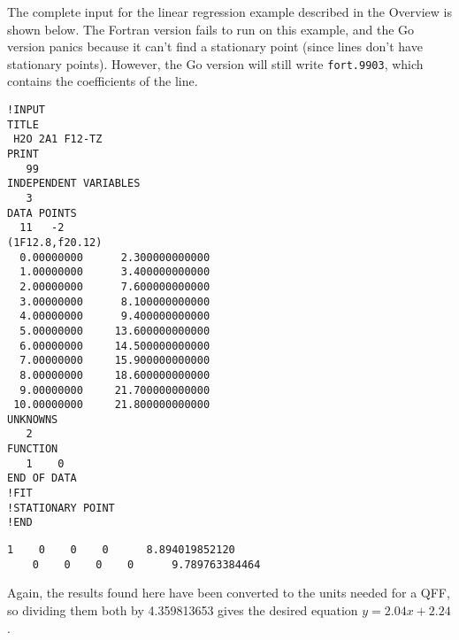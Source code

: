 \documentclass{article}
\begin{document}
The complete input for the linear regression example described in the Overview
is shown below. The Fortran version fails to run on this example, and the Go
version panics because it can't find a stationary point (since lines don't have
stationary points). However, the Go version will still write \verb|fort.9903|,
which contains the coefficients of the line.

\begin{lstlisting}[caption={anpass.in}]
!INPUT
TITLE
 H2O 2A1 F12-TZ
PRINT
   99
INDEPENDENT VARIABLES
   3
DATA POINTS
  11   -2
(1F12.8,f20.12)
  0.00000000      2.300000000000
  1.00000000      3.400000000000
  2.00000000      7.600000000000
  3.00000000      8.100000000000
  4.00000000      9.400000000000
  5.00000000     13.600000000000
  6.00000000     14.500000000000
  7.00000000     15.900000000000
  8.00000000     18.600000000000
  9.00000000     21.700000000000
 10.00000000     21.800000000000
UNKNOWNS
   2
FUNCTION
   1    0
END OF DATA
!FIT
!STATIONARY POINT
!END
\end{lstlisting}

\begin{lstlisting}[caption={fort.9903}]
    1    0    0    0      8.894019852120
    0    0    0    0      9.789763384464
\end{lstlisting}

\noindent
Again, the results found here have been converted to the units needed for a QFF,
so dividing them both by 4.359813653 gives the desired equation
$y = 2.04x + 2.24$.
\end{document}
